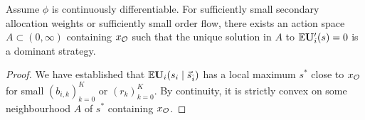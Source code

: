 \begin{comment}
\begin{lemma}

  Suppose $\phi$ is continuously differentiable and invertible, and that player $i$ has positive probability to be allocated a slot.
  If $r$ is small then $\Expectation\Utility_i\left(s_i\mid \vec{s}_{\hat{i}}\right)$ has local maximum close to $x_\oracle$.
  Its location does not depend on $\vec{s}_{\hat{i}}$.

\end{lemma}
%
\begin{proof}

  When $r=0$ we have
  \begin{equation} \label{expected-utility-derivative-zero-volume}
    \Expectation\Utility_i'(s\mid \vec{s}_{\hat{i}}) = \left( \sum_{k=0}^K a_{i,k}( 1- b_{i,k})\right)
      (\phi(s) - \phi(x_\oracle))
  \end{equation}
  whence $\Utility_i''(s)$ is a positive constant multiple of $\phi'(s)<0$ (recall that $b_{i,0}=0$, even for a monopolist).
  This is evidently independent of $\vec{s}_{\hat{i}}$.
  Thus $\Utility_i'$ has a simple zero at $x_\oracle$, which is a local minimum of $\Utility_i(s_i\mid s_{\hat{i}})$, and there is a neighbourhood $(a,b)$ of $x_\oracle$ such that $\Utility_i'(x)<0$ for $x\in (a,x_\oracle)$ and $\Utility_i'(x)>0$ for $x\in (x_\oracle,b)$.
  The claim then follows from a simple continuity argument.
  \qedhere
  
\end{proof}
\end{comment}

\begin{theorem} \label{dominant-strategy-unique} \label{theorem-existence}
  
  Assume $\phi$ is continuously differentiable.
  For sufficiently small secondary allocation weights or sufficiently small order flow, there exists an action space $A\subset(0,\infty)$ containing $x_{\mathcal{O}}$ such that the unique solution in $A$ to $\mathbb{E}\mathbf{U}'_i(s)=0$ is a dominant strategy.
  \qedhere

\end{theorem}
%
\begin{proof}

  We have established that $\mathbb{E}\mathbf{U}_i(s_i\mid \vec{s}_{\hat i})$ has a local maximum ${s^*}$ close to $x_{\mathcal{O}}$ for small $(b_{i,k})_{k=0}^K$ or $(r_k)_{k=0}^K$.
  By continuity, it is strictly convex on some neighbourhood $A$ of ${s^*}$ containing $x_{\mathcal{O}}$.

\end{proof}

